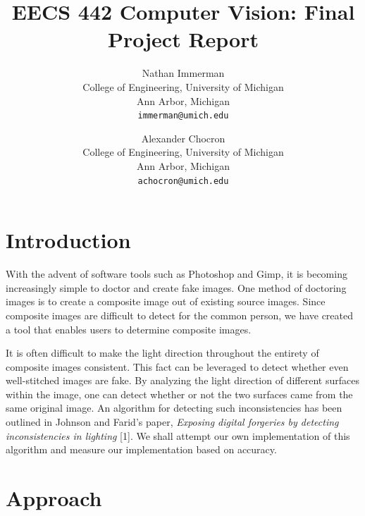 \documentclass[10pt,twocolumn,letterpaper]{article}
\begin{document}
\title{EECS 442 Computer Vision: Final Project Report}

\author{Nathan Immerman\\
College of Engineering, University of Michigan\\
Ann Arbor, Michigan\\
{\tt\small immerman@umich.edu}
\and
Alexander Chocron\\
College of Engineering, University of Michigan\\
Ann Arbor, Michigan\\
{\tt\small achocron@umich.edu}
}

\maketitle

\section{Introduction}

With the advent of software tools such as Photoshop and Gimp, it is becoming increasingly simple to doctor and create fake images. One method of doctoring images is to create a composite image out of existing source images. Since composite images are difficult to detect for the common person, we have created a tool that enables users to determine composite images.

It is often difficult to make the light direction throughout the entirety of composite images consistent. This fact can be leveraged to detect whether even well-stitched images are fake. By analyzing the light direction of different surfaces within the image, one can detect whether or not the two surfaces came from the same original image. An algorithm for detecting such inconsistencies has been outlined in Johnson and Farid's paper, \emph{Exposing digital forgeries by detecting inconsistencies in lighting} [1]. We shall attempt our own implementation of this algorithm and measure our implementation based on accuracy.

\section{Approach}
\end{document}

